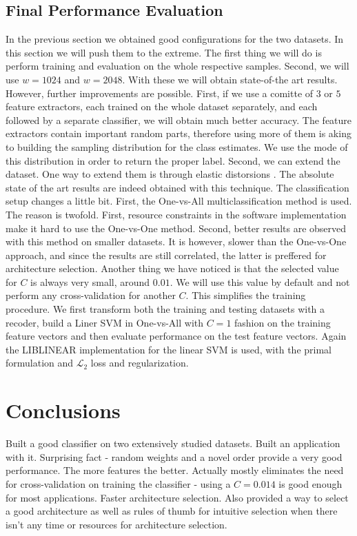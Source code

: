 \documentclass[12pt,a4paper,oneside,english]{UPBThesis}
\begin{document}
\section{Final Performance Evaluation}
\label{sec:FinalPerformanceEvaluation}

In the previous section we obtained good configurations for the two datasets. In this section we will push them to the extreme. The first thing we will do is perform training and evaluation on the whole respective samples. Second, we will use $w=1024$ and $w=2048$. With these we will obtain state-of-the art results. However, further improvements are possible. First, if we use a comitte of $3$ or $5$ feature extractors, each trained on the whole dataset separately, and each followed by a separate classifier, we will obtain much better accuracy. The feature extractors contain important random parts, therefore using more of them is aking to building the sampling distribution for the class estimates. We use the mode of this distribution in order to return the proper label. Second, we can extend the dataset. One way to extend them is through elastic distorsions \cite{best-practices-cnn}. The absolute state of the art results are indeed obtained with this technique. The classification setup changes a little bit. First, the One-vs-All multiclassification method is used. The reason is twofold. First, resource constraints in the software implementation make it hard to use the One-vs-One method. Second, better results are observed with this method on smaller datasets. It is however, slower than the One-vs-One approach, and since the results are still correlated, the latter is preffered for architecture selection. Another thing we have noticed is that the selected value for $C$ is always very small, around $0.01$. We will use this value by default and not perform any cross-validation for another $C$. This simplifies the training procedure. We first transform both the training and testing datasets with a recoder, build a Liner SVM in One-vs-All with $C=1$ fashion on the training feature vectors and then evaluate performance on the test feature vectors. Again the LIBLINEAR implementation for the linear SVM is used, with the primal formulation and $\mathcal{L}_2$ loss and regularization.

\chapter{Conclusions}
\label{chap:Conclusions}

Built a good classifier on two extensively studied datasets.
Built an application with it.
Surprising fact - random weights and a novel order provide a very good performance. The more features the better.
Actually mostly eliminates the need for cross-validation on training the classifier - using a $C = 0.014$ is good enough for most applications. Faster architecture selection. Also provided a way to select a good architecture as well as rules of thumb for intuitive selection when there isn't any time or resources for architecture selection.




\appendix
\end{document}
